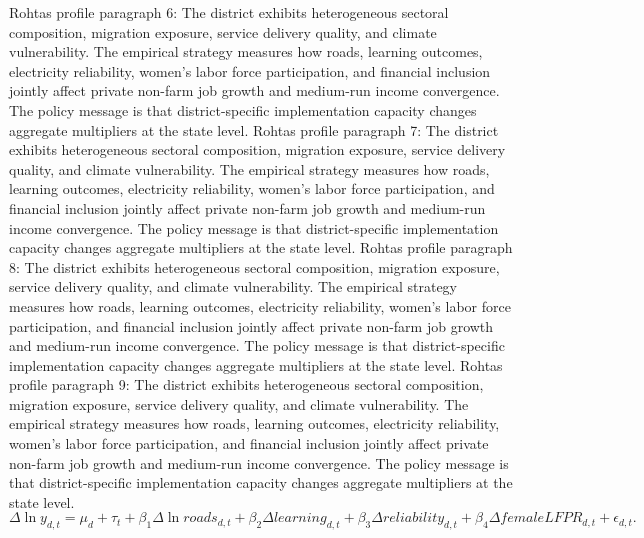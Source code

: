 \documentclass[preprint,12pt]{elsarticle}
\begin{document}
Rohtas profile paragraph 6: The district exhibits heterogeneous sectoral composition, migration exposure, service delivery quality, and climate vulnerability. The empirical strategy measures how roads, learning outcomes, electricity reliability, women's labor force participation, and financial inclusion jointly affect private non-farm job growth and medium-run income convergence. The policy message is that district-specific implementation capacity changes aggregate multipliers at the state level.
Rohtas profile paragraph 7: The district exhibits heterogeneous sectoral composition, migration exposure, service delivery quality, and climate vulnerability. The empirical strategy measures how roads, learning outcomes, electricity reliability, women's labor force participation, and financial inclusion jointly affect private non-farm job growth and medium-run income convergence. The policy message is that district-specific implementation capacity changes aggregate multipliers at the state level.
Rohtas profile paragraph 8: The district exhibits heterogeneous sectoral composition, migration exposure, service delivery quality, and climate vulnerability. The empirical strategy measures how roads, learning outcomes, electricity reliability, women's labor force participation, and financial inclusion jointly affect private non-farm job growth and medium-run income convergence. The policy message is that district-specific implementation capacity changes aggregate multipliers at the state level.
Rohtas profile paragraph 9: The district exhibits heterogeneous sectoral composition, migration exposure, service delivery quality, and climate vulnerability. The empirical strategy measures how roads, learning outcomes, electricity reliability, women's labor force participation, and financial inclusion jointly affect private non-farm job growth and medium-run income convergence. The policy message is that district-specific implementation capacity changes aggregate multipliers at the state level.
\begin{equation}\Delta \ln y_{d,t}=\mu_d+\tau_t+\beta_1\Delta\ln roads_{d,t}+\beta_2\Delta learning_{d,t}+\beta_3\Delta reliability_{d,t}+\beta_4\Delta femaleLFPR_{d,t}+\epsilon_{d,t}.\end{equation}
\end{document}
